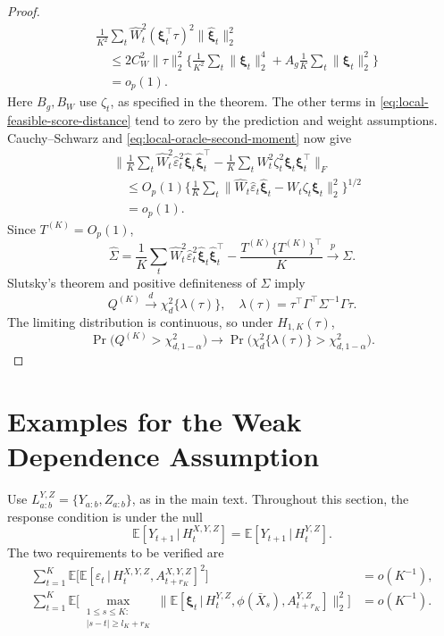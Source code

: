 \documentclass[12pt]{article}
\def\E{\mathbb{E}}
\newcommand\given{\,|\,}
\numberwithin{equation}{section}
\begin{document}
\begin{proof}
\begin{align*}
&\frac1{K^2}\sum_t\hat W_t^2
(\boldsymbol\xi_t^\top\tau)^2\|\hat{\boldsymbol\xi}_t\|_2^2\\
&\quad\leq2C_W^2\|\tau\|_2^2
\bigg\{\frac1{K^2}\sum_t\|\boldsymbol\xi_t\|_2^4
+A_g\frac1K\sum_t\|\boldsymbol\xi_t\|_2^2\bigg\}\\
&\quad =o_p(1).
\end{align*}
Here \(B_g,B_W\) use \(\zeta_t\), as specified in the theorem.
The other terms in \eqref{eq:local-feasible-score-distance} tend to zero
by the prediction and weight assumptions. Cauchy--Schwarz and \eqref{eq:local-oracle-second-moment} now give
\begin{align*}
&\Big\|\frac1K\sum_t
\hat W_t^2\hat\varepsilon_t^2
\hat{\boldsymbol\xi}_t\hat{\boldsymbol\xi}_t^\top
-\frac1K\sum_tW_t^2\zeta_t^2
\boldsymbol\xi_t\boldsymbol\xi_t^\top\Big\|_F\\
&\quad\leq O_p(1)
\bigg\{\frac1K\sum_t\big\|
\hat W_t\hat\varepsilon_t\hat{\boldsymbol\xi}_t
-W_t\zeta_t\boldsymbol\xi_t\big\|_2^2\bigg\}^{1/2}\\
&\quad =o_p(1).
\end{align*}
Since \(T^{(K)}=O_p(1)\),
\[
\hat\Sigma
=\frac1K\sum_t\hat W_t^2\hat\varepsilon_t^2
\hat{\boldsymbol\xi}_t\hat{\boldsymbol\xi}_t^\top
-\frac{T^{(K)}\{T^{(K)}\}^\top}{K}
\xrightarrow{p}\Sigma.
\]
Slutsky's theorem and positive definiteness of \(\Sigma\) imply
\[
Q^{(K)}\xrightarrow{d}\chi_d^2\{\lambda(\tau)\},\quad
\lambda(\tau)=\tau^\top\Gamma^\top\Sigma^{-1}\Gamma\tau.
\]
The limiting distribution is continuous, so under $H_{1,K}(\tau)$,
\[
\Pr\big(Q^{(K)}>\chi^2_{d,1-\alpha}\big)
\rightarrow
\Pr\big(\chi_d^2\{\lambda(\tau)\}>\chi^2_{d,1-\alpha}\big).
\]
\end{proof}
 

\section{Examples for the Weak Dependence Assumption}
\label{app:mixing-example}

Use $L^{Y,Z}_{a:b}=\{Y_{a:b},Z_{a:b}\}$, as in the main text.
Throughout this section, the response condition is under the null
\begin{equation}\label{eq:null-recalled}
 \E[Y_{t+1}\given H_t^{X,Y,Z}]=\E[Y_{t+1}\given H_t^{Y,Z}].
\end{equation}
The two requirements to be verified are
\begin{align}
 \sum_{t=1}^K\E \big[
  \E[\varepsilon_t\given H_t^{X,Y,Z},A_{t+r_K}^{X,Y,Z}]^2
 \big]&=o(K^{-1}),\\
 \sum_{t=1}^K\E \Big[
  \max_{\substack{1\leq s\leq K:\\|s-t|\geq l_K+r_K}}
  \big\|\E[\boldsymbol\xi_t\given H_t^{Y,Z},
          \phi(\bar X_s),A_{t+r_K}^{Y,Z}]\big\|_2^2
 \Big]&=o(K^{-1}).
\end{align}
\end{document}
